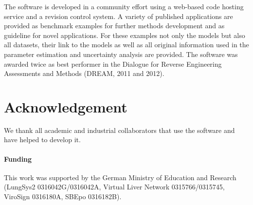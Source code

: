 \documentclass{bioinfo}
\begin{document}
The software is developed in a community effort using a web-based 
code hosting service 
and a revision control system. A variety of published applications are provided as benchmark examples for further methods development and as guideline for novel applications. For these examples not only the models but also all datasets, their link to the models as well as all original information used in the parameter estimation and uncertainty analysis are provided. The software was awarded twice as best performer in the Dialogue for Reverse Engineering Assessments and Methods (DREAM, 2011 and 2012).

\section*{Acknowledgement}
We thank all academic and industrial collaborators that use the software  
and have helped to develop it.

\paragraph{Funding\textcolon} 
This work was supported by the German Ministry of Education and Research (LungSys2 
0316042G/0316042A, Virtual Liver Network 0315766/0315745, ViroSign 0316180A,
SBEpo 0316182B).




\end{document}
